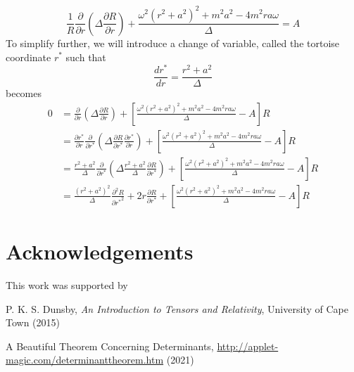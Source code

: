 \documentclass[11pt]{article}
\numberwithin{equation}{section}
\numberwithin{figure}{section}
\numberwithin{table}{section}
\begin{document}
\begin{equation}
    \frac{1}{R}\frac{\partial}{\partial r}\left(\Delta\frac{\partial R}{\partial r}\right)+\frac{\omega^2(r^2+a^2)^2+m^2a^2-4m^2ra\omega}{\Delta}=A
    \label{eqn:radial wave equation}
\end{equation}
To simplify further, we will introduce a change of variable, called the tortoise coordinate $r^*$ such that
\begin{equation}
    \frac{dr^*}{dr}=\frac{r^2+a^2}{\Delta}
    \label{eqn:tortoise coordinates}
\end{equation}
 becomes
\begin{align*}
    0&=\frac{\partial}{\partial r}\left(\Delta\frac{\partial R}{\partial r}\right)+\left[\frac{\omega^2(r^2+a^2)^2+m^2a^2-4m^2ra\omega}{\Delta}-A\right]R\\
    &=\frac{\partial r^*}{\partial r}\frac{\partial}{\partial r^*}\left(\Delta\frac{\partial R}{\partial r^*}\frac{\partial r^*}{\partial r}\right)+\left[\frac{\omega^2(r^2+a^2)^2+m^2a^2-4m^2ra\omega}{\Delta}-A\right]R\\
    &=\frac{r^2+a^2}{\Delta}\frac{\partial}{\partial r^*}\left(\Delta\frac{r^2+a^2}{\Delta}\frac{\partial R}{\partial r^*}\right)+\left[\frac{\omega^2(r^2+a^2)^2+m^2a^2-4m^2ra\omega}{\Delta}-A\right]R\\
    &=\frac{(r^2+a^2)^2}{\Delta}\frac{\partial^2 R}{\partial {r^*}^2}+2r\frac{\partial R}{\partial r^*}+\left[\frac{\omega^2(r^2+a^2)^2+m^2a^2-4m^2ra\omega}{\Delta}-A\right]R
\end{align*}


\section*{Acknowledgements}
This work was supported by


\begin{thebibliography}{9}
    P. K. S. Dunsby, \textit{An Introduction to Tensors and Relativity}, University of Cape Town (2015)

    A Beautiful Theorem Concerning Determinants, \url{http://applet-magic.com/determinanttheorem.htm} (2021)
\end{thebibliography}
    
\end{document}

